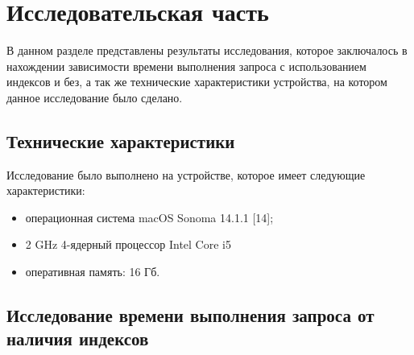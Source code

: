 \chapter*{Исследовательская часть}

В данном разделе представлены результаты исследования, которое заключалось в нахождении
зависимости времени выполнения запроса с использованием индексов и без, а так же технические 
характеристики устройства, на котором данное исследование было сделано.

\section{Технические характеристики}

Исследование было выполнено на устройстве, 
которое имеет следующие характеристики:

\begin{itemize}
    \item операционная система macOS Sonoma 14.1.1 [14];
    \item 2 GHz 4-ядерный процессор Intel Core i5
    \item оперативная память: 16 Гб.
\end{itemize}

\section{Исследование времени выполнения запроса от наличия индексов}


